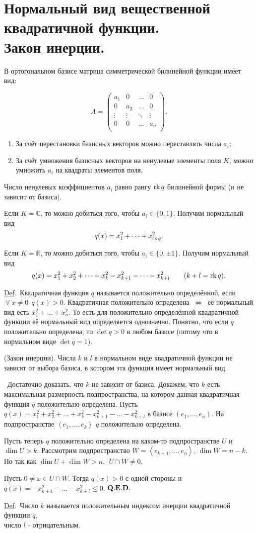\documentclass[draft]{article}%
\newcommand{\rk}{{\rm rk\,}}%
\newcommand{\de}{\par\noindent\underline{Def}.\ }%
\newcommand{\ab}{\par\noindent}%
\newcommand{\dok}{\par\noindent{\textsl{Доказательство}.}\ }%
\newcommand{\qed}{\quad${{\bf Q.E.D.}}$}
\newcommand{\baz}[1]{\left(#1_1,\dots,#1_n\right)}%
\newcommand{\lr}{\Leftrightarrow}%
\newcommand{\lob}[1]{\left\langle#1\right\rangle}%
\renewcommand{\le}{\leqslant}
\begin{document}
\section{Нормальный вид вещественной квадратичной функции.\\ Закон инерции.}
\label{q12} %
В ортогональном базисе матрица симметрической билинейной функции имеет вид:\ab%
$$A=\left(%
\begin{array}{cccc}
  a_1 & 0 & \dots & 0 \\
  0 & a_2 & \dots & 0 \\
  \vdots & \vdots & \ddots & \vdots \\
  0 & 0 & \dots & a_n \\
\end{array}%
\right).$$
\begin{enumerate}
    \item За счёт перестановки базисных векторов можно переставлять числа $a_i$;
    \item За счёт умножения базисных векторов на ненулевые элементы поля $K$, можно умножить $a_i$ на квадраты
    элементов поля.
\end{enumerate}
\ab Число ненулевых коэффициентов $a_i$ равно рангу $\rk q$ билинейной формы (и не зависит от базиса). %
\ab Если $K=\mathbb{C}$, то можно добиться того, чтобы $a_i\in\{0,1\}$. Получим нормальный вид
$$q(x)=x_1^2+\dots+x_{\rk q}^2.$$
\ab Если $K=\mathbb{R}$, то можно добиться того, чтобы $a_i\in\{0, \pm 1\}.$ Получим нормальный вид
$$
q(x)=x_1^2+x_2^2+\dots+x_k^2-x_{k+1}^2-\dots-x_{k+l}^2\qquad(k+l=\rk q).
$$
\de Квадратичная функция $q$ называется положительно определённой, если $\ \forall\ x\ne 0\ \ q(x)>0.$
Квадратичная положительно определена $\ \lr\ $ её нормальный вид есть $x_1^2+\dots+x_n^2.$ То есть для
положительно определённой квадратичной функции её нормальный вид определяется однозначно. Понятно, что если
$q$ положительно определена, то $\det q>0$ в любом базисе (потому что в нормальном виде $\det q=1$). %
\ab{\bf Теорема} (Закон инерции). Числа $k$ и $l$ в нормальном виде квадратичной функции не зависят от выбора
базиса, в котором эта функция имеет нормальный вид. %
\dok Достаточно доказать, что $k$ не зависит от базиса. Докажем, что $k$ есть максимальная размерность
подпространства, на котором данная квадратичная функция $q$ положительно определена. %
Пусть $q(x)=x_1^2+x_2^2+\dots+x_k^2-x_{k+1}^2-\dots-x_{k+l}^2$ в базисе $\baz{e}$. На подпространстве
$\lob{e_1,\dots,e_k}$ $q$ положительно определена. %
\ab Пусть теперь $q$ положительно определена на каком-то подпространстве $U$ и $\dim U>k$. Рассмотрим
подпространство $W=\lob{e_{k+1},\dots,e_n}$, $\dim W=n-k$. Но так как $\dim U+\dim W>n,\ \ U\cap W\ne 0.$ %
\ab Пусть $0\ne x\in U\cap W.$ Тогда $q(x)>0$ с одной стороны и $q(x)=-x_{k+1}^2-\dots-x_{k+l}^2\le 0$. \qed %
\de Число $k$ называется положительным индексом инерции квадратичной функции $q$, \\число $l$ - отрицательным. %
\end{document}
